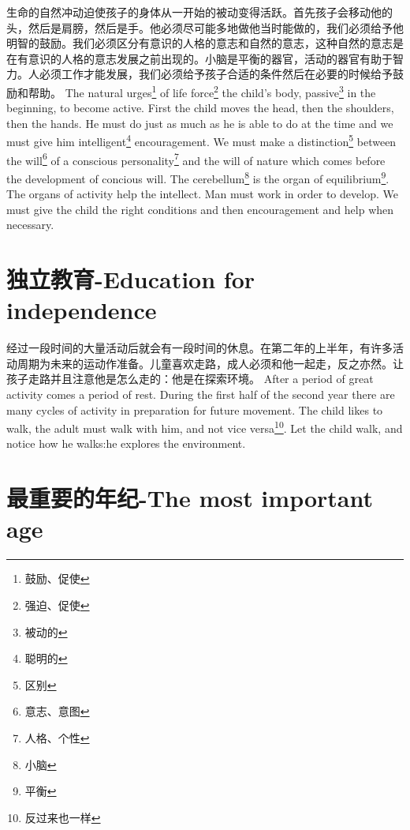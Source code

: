 \documentclass[lang=cn,10pt]{elegantbook}
\begin{document}
\begin{tcolorbox}[title=摘要,
colback=red!5!white,
colframe=red!75!black,
fonttitle=\bfseries]
生命的自然冲动迫使孩子的身体从一开始的被动变得活跃。首先孩子会移动他的头，然后是肩膀，然后是手。他必须尽可能多地做他当时能做的，我们必须给予他明智的鼓励。我们必须区分有意识的人格的意志和自然的意志，这种自然的意志是在有意识的人格的意志发展之前出现的。小脑是平衡的器官，活动的器官有助于智力。人必须工作才能发展，我们必须给予孩子合适的条件然后在必要的时候给予鼓励和帮助。
The natural urges\footnote{鼓励、促使} of life force\footnote{强迫、促使} the child's body, passive\footnote{被动的} in the beginning, to become active. First the child moves the head, then the shoulders, then the hands. He must do just as much as he is able to do at the time and we must give him intelligent\footnote{聪明的} encouragement. We must make a distinction\footnote{区别} between the will\footnote{意志、意图} of a conscious personality\footnote{人格、个性} and the will of nature which comes before the development of concious will. The cerebellum\footnote{小脑} is the organ of equilibrium\footnote{平衡}. The organs of activity help the intellect. Man must work in order to develop. We must give the child the right conditions and then encouragement and help when necessary.
\end{tcolorbox}

\chapter{独立教育-Education for independence}

\begin{tcolorbox}[title=摘要,
colback=red!5!white,
colframe=red!75!black,
fonttitle=\bfseries]
经过一段时间的大量活动后就会有一段时间的休息。在第二年的上半年，有许多活动周期为未来的运动作准备。儿童喜欢走路，成人必须和他一起走，反之亦然。让孩子走路并且注意他是怎么走的：他是在探索环境。
After a period of great activity comes a period of rest. During the first half of the second year there are many cycles of activity in preparation for future movement. The child likes to walk, the adult must walk with him, and not vice versa\footnote{反过来也一样}. Let the child walk, and notice how he walks:he explores the environment.
\end{tcolorbox}

\chapter{最重要的年纪-The most important age}
\end{document}
